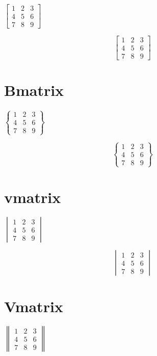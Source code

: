 \documentclass{article}
\begin{document}
$\begin{bmatrix}
	1&2&3\\
	4&5&6\\
	7&8&9
\end{bmatrix}
$

\[
\begin{bmatrix}
	1&2&3\\
	4&5&6\\
	7&8&9
\end{bmatrix}
\]

\section{Bmatrix}
\paragraph{}
$\begin{Bmatrix}
	1&2&3\\
	4&5&6\\
	7&8&9
\end{Bmatrix}
$

\[
\begin{Bmatrix}
	1&2&3\\
	4&5&6\\
	7&8&9
\end{Bmatrix}
\]

\pagebreak

\section{vmatrix}
\paragraph{}
$\begin{vmatrix}
	1&2&3\\
	4&5&6\\
	7&8&9
\end{vmatrix}
$

\[
\begin{vmatrix}
	1&2&3\\
	4&5&6\\
	7&8&9
\end{vmatrix}
\]

\section{Vmatrix}
\paragraph{}
$\begin{Vmatrix}
	1&2&3\\
	4&5&6\\
	7&8&9
\end{Vmatrix}
$
\end{document}
